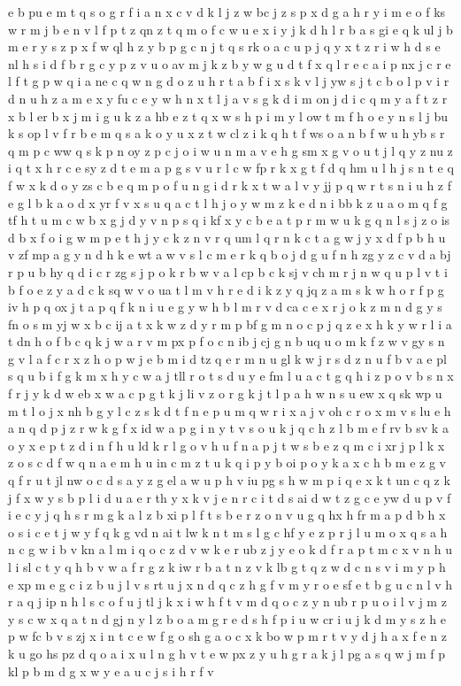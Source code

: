 \documentclass{article}
\begin{document}
e b pu e m t q s o g r f i a n x c v d k l j z w bc j z s p x d g a h r y i m e o f ks w r m j b e n v l f p t z qn z t q m o f c w u e x i y j k d h l r b a s gi e q k ul j b m e r y s z p x f w ql h z y b p g c n j t q s rk o a c u p j q y x t z r i w h d s e nl h s i d f b r g c y p z v u o av m j k z b y w g u d t f x q l r e c a i p nx j c r e l f t g p w q i a ne c q w n g d o z u h r t a b f i x s k v l j yw s j t c b o l p v i r d n u h z a m e x y fu c e y w h n x t l j a v s g k d i m on j d i c q m y a f t z r x b l er b x j m i g u k z a hb e z t q x w s h p i m y l ow t m f h o e y n s l j bu k s op l v f r b e m q s a k o y u x z t w cl z i k q h t f ws o a n b f w u h yb s r q m p c ww q s k p n oy z p c j o i w u n m a v e h g sm x g v o u t j l q y z nu z i q t x h r c e sy z d t e m a p g s v u r l c w fp r k x g t f d q hm u l h j s n t e q f w x k d o y zs c b e q m p o f u n g i d r k x t w a l v y jj p q w r t s n i u h z f e g l b k a o d x yr f v x s u q a c t l h j o y w m z k e d n i bb k z u a o m q f g tf h t u m c w b x g j d y v n p s q i kf x y c b e a t p r m w u k g q n l s j z o is d b x f o i g w m p e t h j y c k z n v r q um l q r n k c t a g w j y x d f p b h u v zf mp a g y n d h k e wt a w v s l c m e r k q b o j d g u f n h zg y z c v d a bj r p u b hy q d i c r zg s j p o k r b w v a l cp b c k sj v ch m r j n w q u p l v t i b f o e z y a d c k sq w v o ua t l m v h r e d i k z y q jq z a m s k w h o r f p g iv h p q ox j t a p q f k n i u e g y w h b l m r v d ca c e x r j o k z m n d g y s fn o s m yj w x b c ij a t x k w z d y r m p bf g m n o c p j q z e x h k y w r l i a t dn h o f b c q k j w a r v m px p f o c n ib j cj g n b uq u o m k f z w v gy s n g v l a f c r x z h o p w j e b m i d tz q e r m n u gl k w j r s d z n u f b v a e pl s q u b i f g k m x h y c w a j tll r o t s d u y e fm l u a c t g q h i z p o v b s n x f r j y k d w eb x w a c p g t k j li v z o r g k j t l p a h w n s u ew x q sk wp u m t l o j x nh b g y l c z s k d t f n e p u m q w r i x a j v oh c r o x m v s lu e h a n q d p j z r w k g f x id w a p g i n y t v s o u k j q c h z l b m e f rv b sv k a o y x e p t z d i n f h u ld k r l g o v h u f n a p j t w s b e z q m c i xr j p l k x z o s c d f w q n a e m h u in c m z t u k q i p y b oi p o y k a x c h b m e z g v q f r u t jl nw o c d s a y z g el a w u p h v iu pg s h w m p i q e x k t un c q z k j f x w y s b p l i d u a e r th y x k v j e n r c i t d s ai d w t z g c e yw d u p v f i e c y j q h s r m g k a l z b xi p l f t s b e r z o n v u g q hx h fr m a p d b h x o s i c e t j w y f q k g vd n ai t lw k n t m s l g c hf y e z p r j l u m o x q s a h n c g w i b v kn a l m i q o c z d v w k e r ub z j y e o k d f r a p t m c x v n h u l i sl c t y q h b v w a f r g z k iw r b a t n z v k lb g t q z w d c n s v i m y p h e xp m e g c i z b u j l v s rt u j x n d q c z h g f v m y r o e sf e t b g u c n l v h r a q j ip n h l s c o f u j tl j k x i w h f t v m d q o c z y n ub r p u o i l v j m z y s c w x q a t n d gj n y l z b o a m g r e d s h f p i u w cr i u j k d m y s z h e p w fc b v s zj x i n t c e w f g o sh g a o c x k bo w p m r t v y d j h a x f e n z k u go hs pz d q o a i x u l n g h v t e w px z y u h g r a k j l pg a s q w j m f p kl p b m d g x w y e a u c j s i h r f v 
\end{document}
